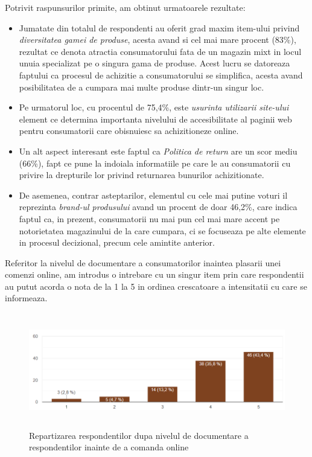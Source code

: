 \documentclass[a4paper, 12pt]{article}
\begin{document}
\begin{enumerate}[(A)]
\begin{center}
		\end{center}
		\qquad Potrivit raspunsurilor primite, am obtinut urmatoarele rezultate:
		\begin{itemize}
			\item Jumatate din totalul de respondenti au oferit grad maxim item-ului privind \textit{diversitatea gamei de produse}, acesta avand si cel mai mare procent (83\%), rezultat ce denota atractia consumatorului fata de un magazin mixt  in locul unuia specializat pe o singura gama de produse. Acest lucru se datoreaza faptului ca procesul de achizitie a consumatorului se simplifica, acesta avand posibilitatea de a cumpara mai multe produse dintr-un singur loc.
			\item Pe urmatorul loc, cu procentul de 75,4\%, este \textit{usurinta utilizarii site-ului} element ce determina importanta nivelului de accesibilitate al paginii web pentru consumatorii care obisnuiesc sa achizitioneze online.
			\item Un alt aspect interesant este faptul ca \textit{Politica de return }are un scor mediu (66\%), fapt ce pune la indoiala informatiile pe care le au consumatorii cu privire la drepturile lor privind returnarea bunurilor achizitionate. 
			\item De asemenea, contrar asteptarilor, elementul cu cele mai putine voturi il reprezinta \textit{brand-ul produsului} avand un procent de doar 46,2\%, care indica faptul ca, in prezent, consumatorii nu mai pun cel mai mare accent pe notorietatea  magazinului de la care cumpara, ci se focuseaza pe alte elemente in procesul  decizional, precum cele amintite anterior.
		\end{itemize}
		
		\quad Referitor la nivelul de documentare a consumatorilor inaintea plasarii unei comenzi online, am introdus o intrebare cu un singur item prin care respondentii au putut acorda o nota de la 1 la 5 in ordinea crescatoare a intensitatii cu care se informeaza.
		
		\begin{figure}[!htb]
			\centering
			\includegraphics[width=14cm, height=5cm]{"figures/trei.png"}
			\caption{ Repartizarea respondentilor dupa nivelul de documentare a respondentilor inainte de a comanda online}\label{fig:unuspre}
		\end{figure}
	

\end{enumerate}
\end{document}
